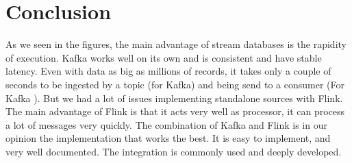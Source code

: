 \documentclass[utf8,9pt]{extarticle}
\begin{document}
\section{Conclusion}
\hspace{2 mm} As we seen in the figures, the main advantage of stream databases is the rapidity of execution. Kafka works well on its own and is consistent and have stable latency. Even with data as big as millions of records, it takes only a couple of seconds to be ingested by a topic (for Kafka) and being send to a consumer (For Kafka ). But we had a lot of issues implementing standalone sources with Flink. The main advantage of Flink is that it acts very well as processor, it can process a lot of messages very quickly. The combination of Kafka and Flink is in our opinion the implementation that works the best. It is easy to implement, and very well documented. The integration is commonly used and deeply developed. 


 \nocite{*}
\printbibliography
\end{document}
